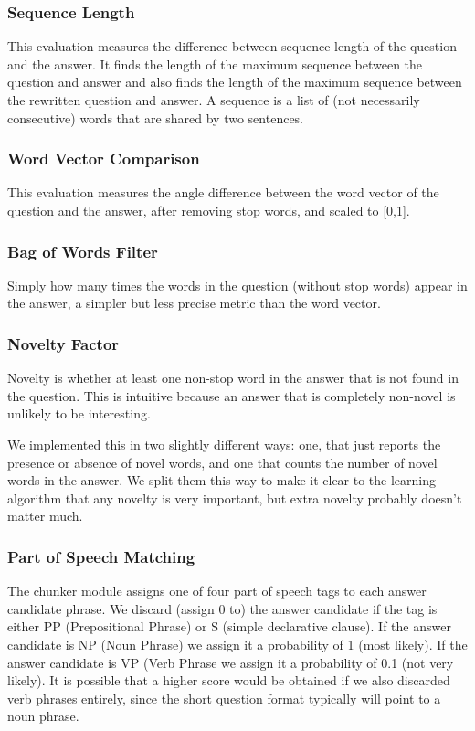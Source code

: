 \documentclass{article}
\begin{document}
\subsubsection{Sequence Length}
This evaluation measures the difference between sequence length of the question
and the answer. It finds the length of the maximum sequence between the
question and answer and also finds the length of the maximum sequence between
the rewritten question and answer. A sequence is a list of (not necessarily 
consecutive) words that are shared by two sentences.

\subsubsection{Word Vector Comparison}

This evaluation measures the angle difference between the word vector of the
question and the answer, after removing stop words, and scaled to [0,1].

\subsubsection{Bag of Words Filter}

Simply how many times the words in the question (without stop words) appear in
the answer, a simpler but less precise metric than the word vector.

\subsubsection{Novelty Factor}

Novelty is whether at least one non-stop word in the answer that is not found in
the question.  This is intuitive because an answer that is completely non-novel
is unlikely to be interesting.

We implemented this in two slightly different ways:  one, that just reports the
presence or absence of novel words, and one that counts the number of novel
words in the answer.  We split them this way to make it clear to the learning
algorithm that any novelty is very important, but extra novelty probably doesn't
matter much.

\subsubsection{Part of Speech Matching}
The chunker module assigns one of four part of speech tags to each answer candidate
phrase. We discard (assign 0 to) the answer candidate if the tag is either PP (Prepositional Phrase) 
or S (simple declarative clause). If the answer candidate is NP (Noun Phrase) we 
assign it a probability of 1 (most likely). If the answer candidate is VP (Verb Phrase
we assign it a probability of 0.1 (not very likely). It is possible that a higher score would be
obtained if we also discarded verb phrases entirely, since the short question format typically
will point to a noun phrase.
\end{document}
